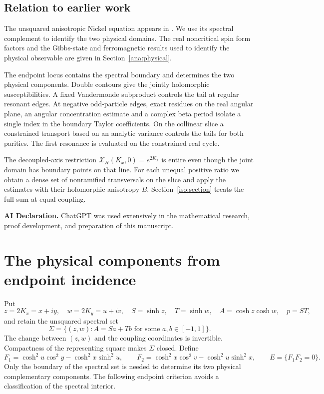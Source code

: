 \documentclass[11pt]{article}
\numberwithin{equation}{section}
\theoremstyle{definition}
\newcommand{\XH}{\mathcal X_H}
\begin{document}
\subsection{Relation to earlier work}

The unsquared anisotropic Nickel equation appears in
\cite[Section 6]{BHM}. We use its spectral complement to identify
the two physical domains. The real noncritical spin form factors
and the Gibbs-state and ferromagnetic results used to identify the
physical observable are given in Section~\ref{ana:physical}.

The endpoint locus contains the spectral boundary and determines the
two physical components. Double contours give the jointly holomorphic
susceptibilities. A fixed Vandermonde subproduct controls the tail at
regular resonant edges. At negative odd-particle edges, exact residues
on the real angular plane, an angular concentration estimate and a
complex beta period isolate a single index in the boundary Taylor
coefficients. On the collinear slice a constrained transport based on
an analytic variance controls the tails for both parities. The first
resonance is evaluated on the constrained real cycle.

The decoupled-axis restriction \(\XH(K_x,0)=e^{2K_x}\) is entire even
though the joint domain has boundary points on that line. For each
unequal positive ratio we obtain a dense set of nonramified
transversals on the slice and apply the estimates with their
holomorphic anisotropy \(B\). Section~\ref{iso:section} treats the full
sum at equal coupling.

\par\medskip\noindent\textbf{AI Declaration.} ChatGPT was used extensively in the mathematical research,
proof development, and preparation of this manuscript.\par

\clearpage
\tableofcontents
\clearpage


\section{The physical components from endpoint incidence}
\label{geo:section}

Put
\[
 z=2K_x=x+iy,\quad w=2K_y=u+iv,\quad
 S=\sinh z,\quad T=\sinh w,\quad A=\cosh z\cosh w,\quad p=ST,
\]
and retain the unsquared spectral set
\begin{equation}\label{geo:sigma}
 \Sigma=\{(z,w): A=Sa+Tb\text{ for some }a,b\in[-1,1]\}.
\end{equation}
The change between $(z,w)$ and the coupling coordinates is invertible.
Compactness of the representing square makes $\Sigma$ closed.
Define
\begin{equation}\label{geo:F}
 F_1=\cosh^2u\cos^2y-\cosh^2x\sinh^2u,\qquad
 F_2=\cosh^2x\cos^2v-\cosh^2u\sinh^2x,
 \qquad E=\{F_1F_2=0\}.
\end{equation}
Only the boundary of the spectral set is needed to determine its two
physical complementary components.  The following endpoint criterion
avoids a classification of the spectral interior.
\end{document}
